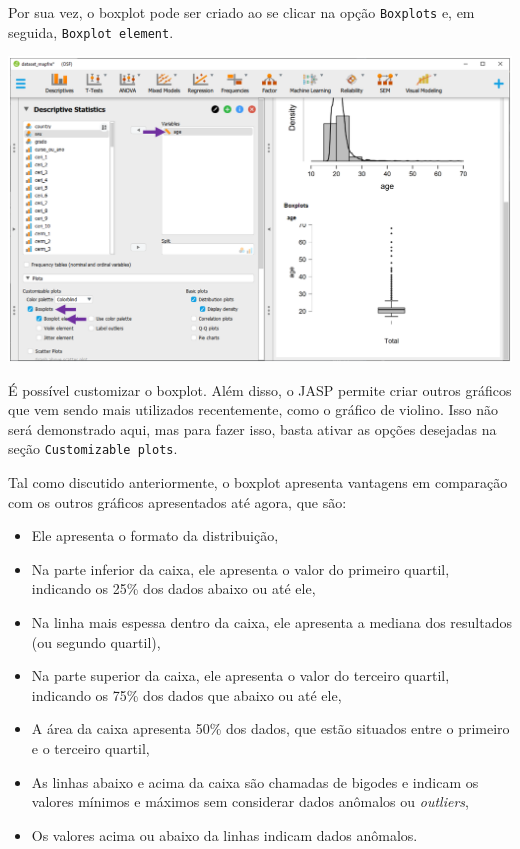 \documentclass[
]{book}
\providecommand{\tightlist}{%
  \setlength{\itemsep}{0pt}\setlength{\parskip}{0pt}}
\begin{document}
Por sua vez, o boxplot pode ser criado ao se clicar na opção \texttt{Boxplots} e, em seguida, \texttt{Boxplot\ element}.

\includegraphics{./img/cap_desc_jasp_grafico_boxplot.png}

É possível customizar o boxplot. Além disso, o JASP permite criar outros gráficos que vem sendo mais utilizados recentemente, como o gráfico de violino. Isso não será demonstrado aqui, mas para fazer isso, basta ativar as opções desejadas na seção \texttt{Customizable\ plots}.

Tal como discutido anteriormente, o boxplot apresenta vantagens em comparação com os outros gráficos apresentados até agora, que são:

\begin{itemize}
\tightlist
\item
  Ele apresenta o formato da distribuição,\\
\item
  Na parte inferior da caixa, ele apresenta o valor do primeiro quartil, indicando os 25\% dos dados abaixo ou até ele,\\
\item
  Na linha mais espessa dentro da caixa, ele apresenta a mediana dos resultados (ou segundo quartil),\\
\item
  Na parte superior da caixa, ele apresenta o valor do terceiro quartil, indicando os 75\% dos dados que abaixo ou até ele,\\
\item
  A área da caixa apresenta 50\% dos dados, que estão situados entre o primeiro e o terceiro quartil,\\
\item
  As linhas abaixo e acima da caixa são chamadas de bigodes e indicam os valores mínimos e máximos sem considerar dados anômalos ou \emph{outliers},\\
\item
  Os valores acima ou abaixo da linhas indicam dados anômalos.
\end{itemize}
\end{document}
